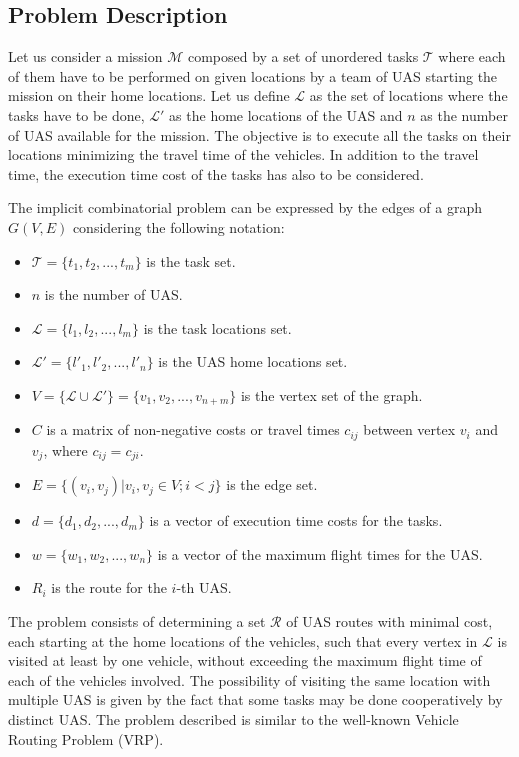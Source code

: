 \documentclass[twocolumn]{svjour3}          %
\begin{document}
\subsection{Problem Description}
    \label{sec:pdesc}
    
    Let us consider a mission $\mathcal{M}$ composed by a set of unordered tasks $\mathcal{T}$ where each of them have to be performed on given locations by a team of UAS starting the mission on their home locations. Let us define $\mathcal{L}$ as the set of locations where the tasks have to be done, $\mathcal{L'}$ as the home locations of the UAS and $n$ as the number of UAS available for the mission. The objective is to execute all the tasks on their locations minimizing the travel time of the vehicles. In addition to the travel time, the execution time cost of the tasks has also to be considered.
    
    The implicit combinatorial problem can be expressed by the edges of a graph $G(V,E)$ considering the following notation:
    
    \begin{itemize}
    	\item $\mathcal{T} = \{t_1, t_2, ..., t_m\}$ is the task set.
    	\item $n$ is the number of UAS.
    	\item $\mathcal{L} = \{l_1, l_2, ..., l_m\}$ is the task locations set.    	
    	\item $\mathcal{L'} = \{l'_1, l'_2, ..., l'_n\}$ is the UAS home locations set.
  		\item $V=\{\mathcal{L}\cup\mathcal{L'}\}=\{v_1, v_2, ..., v_{n+m}\}$ is the vertex set of the graph.
		\item $C$ is a matrix of non-negative costs or travel times $c_{ij}$ between vertex $v_i$ and $v_j$, where $c_{ij}=c_{ji}$.
		\item $E=\{(v_i,v_j) | v_i,v_j \in V; i<j\}$ is the edge set.
		\item $d = \{d_1, d_2, ..., d_m\}$ is a vector of execution time costs for the tasks.
		\item $w = \{w_1, w_2, ..., w_n\}$ is a vector of the maximum flight times for the UAS.
		\item $R_i$ is the route for the $i$-th UAS.
	\end{itemize}
	
	The problem consists of determining a set $\mathcal{R}$ of UAS routes with minimal cost, each starting at the home locations of the vehicles, such that every vertex in $\mathcal{L}$ is visited at least by one vehicle, without exceeding the maximum flight time of each of the vehicles involved. The possibility of visiting the same location with multiple UAS is given by the fact that some tasks may be done cooperatively by distinct UAS. The problem described is similar to the well-known Vehicle Routing Problem (VRP).
	
\end{document}
